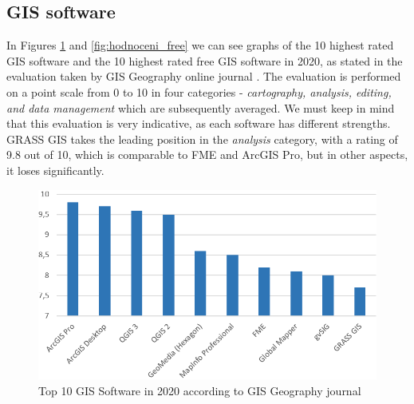 \documentclass[a4paper,10pt,twoside]{article}
\begin{document}
\subsection{GIS software}
\label{subsection:GIS software}

\noindent In Figures \ref{fig:hodnoceni_all} and
\ref{fig:hodnoceni_free} we can see graphs of the 10 highest rated GIS
software and the 10 highest rated free GIS software in 2020, as stated
in the evaluation taken by GIS Geography online journal
\cite{gisgeography}. The evaluation is performed on a point scale from
0 to 10 in four categories - \textit{cartography, analysis, editing,
  and data management} which are subsequently averaged. We must keep
in mind that this evaluation is very indicative, as each software has
different strengths. GRASS GIS takes the leading position in the
\textit{analysis} category, with a rating of 9.8 out of 10, which is
comparable to FME and ArcGIS Pro, but in other aspects, it loses
significantly.

\vspace{0.3cm}
\begin{figure}[hbt!] 
\begin{center}
\includegraphics[width=13cm]{../pictures/hodnoceni_all.png} 
\caption[Top 10 GIS Software in 2020 according to GIS Geography journal]{Top 10 GIS Software in 2020 according to GIS Geography journal \cite{gisgeography}}
\label{fig:hodnoceni_all}
\end{center}
\end{figure}
\end{document}
